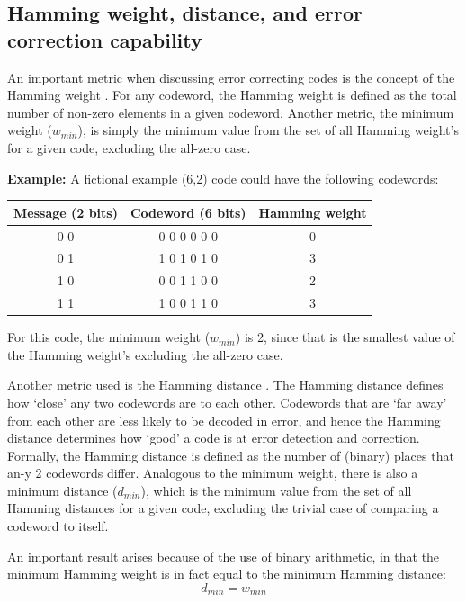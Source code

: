 \documentclass[11pt]{article}
\numberwithin{equation}{subsection}
\begin{document}
\subsection{Hamming weight, distance, and error correction capability}

An important metric when discussing error correcting codes is the concept of the Hamming weight \cite{coon15}. 
For any codeword, the Hamming weight is defined as the total number of non-zero elements in a given codeword. 
Another metric, the minimum weight ($w_{min}$), is simply the minimum value from the set of all Hamming weight's for a given code, excluding the all-zero case.

\textbf{Example:}
A fictional example (6,2) code could have the following codewords:

\begin{center}
\begin{tabular}{ c | c | c }
Message (2 bits) & Codeword (6 bits) & Hamming weight \\
\hline
0 0 & 0 0 0 0 0 0 & 0 \\
0 1 & 1 0 1 0 1 0 & 3 \\
1 0 & 0 0 1 1 0 0 & 2 \\
1 1 & 1 0 0 1 1 0 & 3 \\
\end{tabular}
\end{center}
For this code, the minimum weight ($w_{min}$) is 2, since that is the smallest value of the Hamming weight's excluding the all-zero case.

Another metric used is the Hamming distance \cite{coon15}. The Hamming distance defines how `close' any two codewords are to each other. Codewords that are `far away' from each other are less likely to be decoded in error, and hence the Hamming distance determines how `good' a code is at error detection and correction. Formally, the Hamming distance is defined as the number of (binary) places that an-y 2 codewords differ. Analogous to the minimum weight, there is also a minimum distance ($d_{min}$), which is the minimum value from the set of all Hamming distances for a given code, excluding the trivial case of comparing a codeword to itself.

An important result arises because of the use of binary arithmetic, in that the minimum Hamming weight is in fact equal to the minimum Hamming distance:
\begin{equation}
d_{min} = w_{min}
\end{equation}
\end{document}
